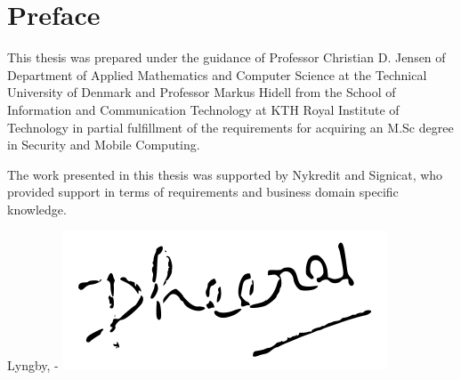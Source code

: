 \chapter{Preface}

This thesis was prepared under the guidance of Professor Christian D. Jensen of Department of Applied Mathematics and Computer Science at the Technical University of Denmark and Professor Markus Hidell from the School of Information and Communication Technology at KTH Royal Institute of Technology in partial fulfillment of the requirements for acquiring an M.Sc degree in Security and Mobile Computing.

The work presented in this thesis was supported by Nykredit and Signicat, who provided support in terms of requirements and business domain specific knowledge.

\vspace{15mm}
\begin{center}
    \hspace{15mm} Lyngby, \thesishandin-\thesisyear
    \vspace{5mm}
    \newline
    \includegraphics[scale=0.5]{figures/Signature}
\end{center}
\begin{flushright}
    \thesisauthor
\end{flushright}
